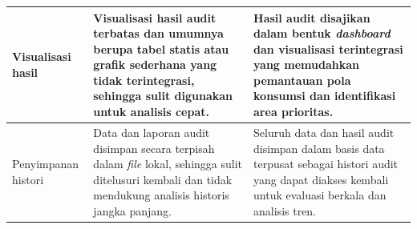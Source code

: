 \begin{tabularx}{\textwidth}{
  >{\raggedright\arraybackslash}X 
  p{5cm} 
  p{5cm}
}
  \hline
  Visualisasi hasil 
  & Visualisasi hasil audit terbatas dan umumnya berupa tabel statis atau grafik sederhana yang tidak terintegrasi, sehingga sulit digunakan untuk analisis cepat. 
  & Hasil audit disajikan dalam bentuk \textit{dashboard} dan visualisasi terintegrasi yang memudahkan pemantauan pola konsumsi dan identifikasi area prioritas. \\
  \hline
  Penyimpanan histori 
  & Data dan laporan audit disimpan secara terpisah dalam \textit{file} lokal, sehingga sulit ditelusuri kembali dan tidak mendukung analisis historis jangka panjang. 
  & Seluruh data dan hasil audit disimpan dalam basis data terpusat sebagai histori audit yang dapat diakses kembali untuk evaluasi berkala dan analisis tren. \\
  \hline
\end{tabularx}